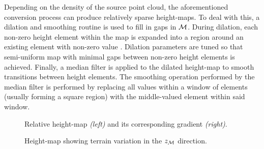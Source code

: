 			Depending on the density of the source point cloud, the aforementioned conversion process can produce relatively sparse height-maps. To deal with this, a dilation and smoothing routine is used to fill in gaps in ${\cal M}$. During dilation, each non-zero height element within the map is expanded into a region around an existing element with non-zero value \cite{opencv_learn_immorph}. Dilation parameters are tuned so that semi-uniform map with minimal gaps between non-zero height elements is achieved. Finally, a median filter is applied to the dilated height-map to smooth transitions between height elements. The smoothing operation performed by the median filter is performed by replacing all values within a window of elements (usually forming a square region) with the middle-valued element within said window.
				\begin{figure}[t!]
					\centering
					\caption{Relative height-map \emph{(left)} and its corresponding gradient \emph{(right)}.}
					\label{fig::heightmap_terrain_patch}
				\end{figure}
				\begin{figure}[!h]
					\centering
					\caption{Height-map showing terrain variation in the $z_{{\cal M}}$ direction.}
					\label{fig::heightmap_terrain_patch_ortho}
				\end{figure}							

